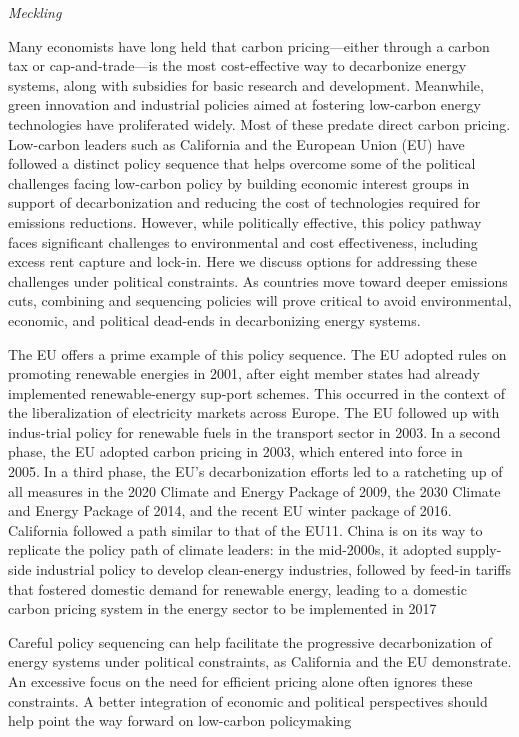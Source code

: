 \documentclass[
]{book}
\begin{document}
\emph{Meckling}

Many economists have long held that carbon pricing---either through a carbon tax or cap-and-trade---is the most cost-effective way to decarbonize energy systems, along with subsidies for basic research and development. Meanwhile, green innovation and industrial policies aimed at fostering low-carbon energy technologies have proliferated widely. Most of these predate direct carbon pricing. Low-carbon leaders such as California and the European Union (EU) have followed a distinct policy sequence that helps overcome some of the political challenges facing low-carbon policy by building economic interest groups in support of decarbonization and reducing the cost of technologies required for emissions reductions. However, while politically effective, this policy pathway faces significant challenges to environmental and cost effectiveness, including excess rent capture and lock-in. Here we discuss options for addressing these challenges under political constraints. As countries move toward deeper emissions cuts, combining and sequencing policies will prove critical to avoid environmental, economic, and political dead-ends in decarbonizing energy systems.

The EU offers a prime example of this policy sequence. The EU adopted rules on promoting renewable energies in 2001, after eight member states had already implemented renewable-energy sup-port schemes. This occurred in the context of the liberalization of electricity markets across Europe. The EU followed up with indus-trial policy for renewable fuels in the transport sector in 2003.In a second phase, the EU adopted carbon pricing in 2003, which entered into force in 2005.In a third phase, the EU's decarbonization efforts led to a ratcheting up of all measures in the 2020 Climate and Energy Package of 2009, the 2030 Climate and Energy Package of 2014, and the recent EU winter package of 2016. California followed a path similar to that of the EU11. China is on its way to replicate the policy path of climate leaders: in the mid-2000s, it adopted supply-side industrial policy to develop clean-energy industries, followed by feed-in tariffs that fostered domestic demand for renewable energy, leading to a domestic carbon pricing system in the energy sector to be implemented in 2017

Careful policy sequencing can help facilitate the progressive decarbonization of energy systems under political constraints, as California and the EU demonstrate. An excessive focus on the need for efficient pricing alone often ignores these constraints. A better integration of economic and political perspectives should help point the way forward on low-carbon policymaking
\end{document}
